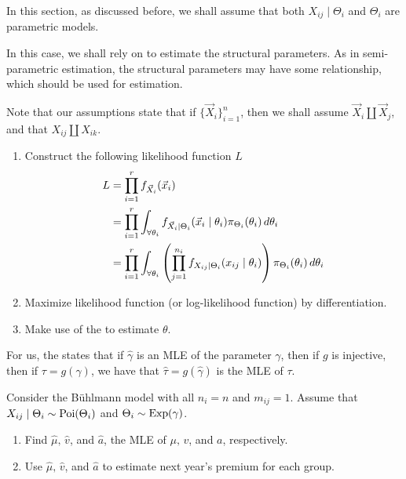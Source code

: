 \documentclass[notoc,notitlepage]{tufte-book}
\begin{document}
In this section, as discussed before, we shall assume
that both $X_{ij} \mid \Theta_i$ and $\Theta_i$ are parametric models.

In this case, we shall rely on  
to estimate the structural parameters.
As in semi-parametric estimation, the structural parameters
may have some relationship, which should be used for estimation.

\begin{procedure}\label{procedure:parametric_estimation_of_structural_parameters}
  Note that our assumptions state that if $\{ \vec{X}_i \}_{i=1}^{n}$,
  then we shall assume $\vec{X}_i \coprod \vec{X}_j$, and that
  $X_{ij} \coprod X_{ik}$.
  \begin{enumerate}
    \item Construct the following likelihood function $L$
      \begin{align*}
        L &= \prod_{i=1}^{r} f_{\vec{X}_i}(\vec{x}_i) \\
          &= \prod_{i=1}^{r} \int_{\forall \theta_i}
            f_{\vec{X}_i \mid \Theta_i} (\vec{x}_i \mid \theta_i)
            \pi_{\Theta_i}(\theta_i) \mathop{}\!d{\theta_i} \\
          &= \prod_{i=1}^{r} \int_{\forall \theta_i}
              \left( \prod_{j=1}^{n_i}
                f_{X_{ij} \mid \Theta_i} (x_{ij} \mid \theta_i)
              \right)
            \pi_{\Theta_i}(\theta_i) \mathop{}\!d{\theta_i} \\
      \end{align*}
    \item Maximize likelihood function (or log-likelihood function)
      by differentiation.
    \item Make use of the 
      to estimate $\theta$.
  \end{enumerate}
\end{procedure}

\begin{note}\label{note:invariance_property_of_the_mle}
  For us, the  states that
  if $\hat{\gamma}$ is an MLE of the parameter $\gamma$,
  then if $g$ is injective, then if $\tau = g(\gamma)$,
  we have that $\hat{\tau} = g(\hat{\gamma})$ is the MLE of $\tau$.
\end{note}

\begin{eg}
  Consider the Bühlmann model with all $n_i = n$ and $m_{ij} = 1$.
  Assume that $X_{ij} \mid \Theta_i \sim \operatorname{Poi}(\Theta_i)$ 
  and $\Theta_i \sim \operatorname{Exp}(\gamma)$.
  \begin{enumerate}
    \item Find $\hat{\mu},\, \hat{v}$, and $\hat{a}$,
      the MLE of $\mu,\, v$, and $a$, respectively.
    \item Use $\hat{\mu},\, \hat{v}$, and $\hat{a}$
      to estimate next year's premium for each group.
  \end{enumerate}
\end{eg}
\end{document}
